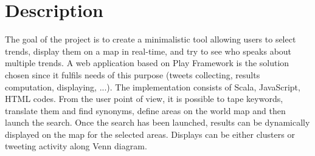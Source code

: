 \section{Description}

The goal of the project is to create a minimalistic tool allowing users to select trends, display them on a map in real-time, and try to see who speaks about multiple trends. 
A web application based on Play Framework is the solution chosen since it fulfils needs of this purpose (tweets collecting, results computation, displaying, ...). The implementation consists of Scala, JavaScript, HTML codes.
From the user point of view, it is possible to tape keywords, translate them and find synonyms, define areas on the world map and then launch the search. Once the search has been launched, results can be dynamically displayed on the map for the selected areas. Displays can be either clusters or tweeting activity along Venn diagram.

